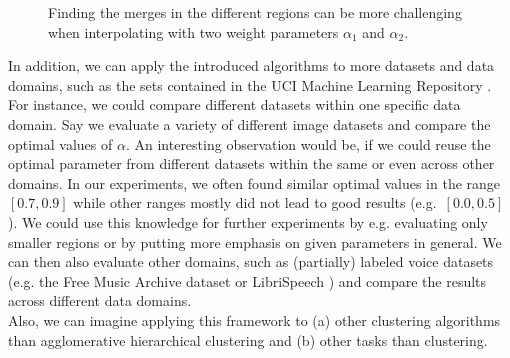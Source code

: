 \begin{figure}[h]
\centering
{}
\caption{Finding the merges in the different regions can be more challenging when interpolating with two weight parameters $\alpha_1$ and $\alpha_2$.}
\label{fig:convexhulls2}
\end{figure}

In addition, we can apply the introduced algorithms to more datasets and data domains, such as the sets contained in the UCI Machine Learning Repository \cite{Dua:2019}. For instance, we could compare different datasets within one specific data domain. Say we evaluate a variety of different image datasets and compare the optimal values of $\alpha$. An interesting observation would be, if we could reuse the optimal parameter from different datasets within the same or even across other domains. In our experiments, we often found similar optimal values in the range $[0.7,0.9]$ while other ranges mostly did not lead to good results (e.g.\ $[0.0, 0.5]$). We could use this knowledge for further experiments by e.g. evaluating only smaller regions or by putting more emphasis on given parameters in general. We can then also evaluate other domains, such as (partially) labeled voice datasets (e.g. the Free Music Archive dataset \cite{fma} or LibriSpeech \cite{librispeech}) and compare the results across different data domains.\\

Also, we can imagine applying this framework to (a) other clustering algorithms than agglomerative hierarchical clustering and (b) other tasks than clustering.